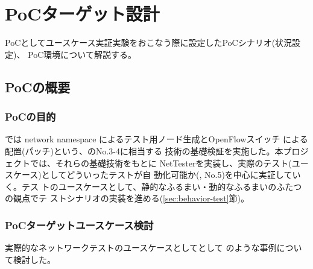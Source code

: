 
\chapter{PoCターゲット設計}
\label{chap:poc-target-design}

PoCとしてユースケース実証実験をおこなう際に設定したPoCシナリオ(状況設定)、
PoC環境について解説する。


 \section{PoCの概要}
 \label{sec:poc-overview}



 \subsection{PoCの目的}
 \label{sec:poc-purpose}

\lopjc では network namespace によるテスト用ノード生成とOpenFlowスイッチ
による配置(パッチ)という、のNo.3-4に相当する
技術の基礎検証を実施した。本プロジェクトでは、それらの基礎技術をもとに
NetTesterを実装し、実際のテスト(ユースケース)としてどういったテストが自
動化可能か(, No.5)を中心に実証していく。テス
トのユースケースとして、静的なふるまい・動的なふるまいのふたつの観点でテ
ストシナリオの実装を進める(\ref{sec:behavior-test}節)。

  \subsection{PoCターゲットユースケース検討}
  \label{sec:poc-usecase-discuss}

実際的なネットワークテストのユースケースとしてとして
のような事例について検討した。

